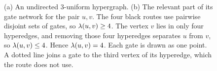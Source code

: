 \begin{figure}[htbp]
{}
\caption[The gate network of a hypergraph]{(a) An undirected $3$-uniform hypergraph. (b) The relevant part of its gate network for the pair $u,v$. The four black routes use pairwise disjoint sets of gates, so $\lambda(u,v)\ge4$. The vertex $v$ lies in only four hyperedges, and removing those four hyperedges separates $u$ from $v$, so $\lambda(u,v)\le4$. Hence $\lambda(u,v)=4$. Each gate is drawn as one point. A dotted line joins a gate to the third vertex of its hyperedge, which the route does not use.}
\label{fig:hyper-gadget-example}
\end{figure}

